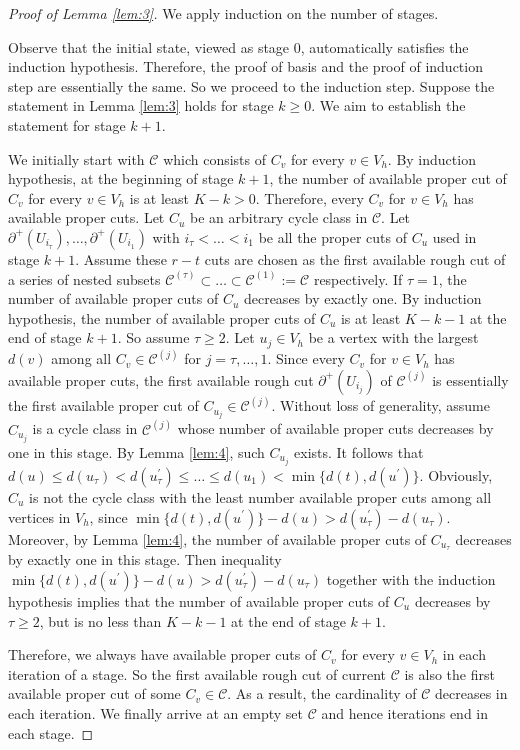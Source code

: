 \documentclass[11pt]{article}
\begin{document}
\begin{proof}[Proof of Lemma \ref{lem:3}]
We apply induction on the number of stages.

Observe that the initial state, viewed as stage 0, automatically satisfies the induction hypothesis. Therefore, the proof of basis and the proof of induction step are essentially the same. So we proceed to the induction step. Suppose the statement in Lemma \ref{lem:3} holds for stage $k\geq 0$. We aim to establish the statement for stage $k+1$.

We initially start with $\mathcal{C}$ which consists of $C_v$ for every $v\in V_h$. By induction hypothesis, at the beginning of stage $k+1$, the number of available proper cut of $C_v$ for every $v\in V_h$ is at least $K-k>0$. Therefore, every $C_v$ for $v\in V_h$ has available proper cuts. Let $C_u$ be an arbitrary cycle class in $\mathcal{C}$. Let $\partial^+(U_{i_\tau}),\dots,\partial^+(U_{i_1})$ with $i_\tau<\dots<i_1$ be all the proper cuts of $C_u$ used in stage $k+1$. Assume these $r-t$ cuts are chosen as the first available rough cut of a series of nested subsets $\mathcal{C}^{(\tau)}\subset\dots\subset\mathcal{C}^{(1)}:=\mathcal{C}$ respectively. If $\tau=1$, the number of available proper cuts of $C_u$ decreases by exactly one. By induction hypothesis, the number of available proper cuts of $C_u$ is at least $K-k-1$ at the end of stage $k+1$. So assume $\tau\geq 2$. Let $u_j\in V_h$ be a vertex with the largest $d(v)$ among all $C_v\in \mathcal{C}^{(j)}$ for $j=\tau,\dots,1$. Since every $C_v$ for $v\in V_h$ has available proper cuts, the first available rough cut $\partial^+(U_{i_j})$ of $\mathcal{C}^{(j)}$ is essentially the first available proper cut of $C_{u_j}\in \mathcal{C}^{(j)}$. Without loss of generality, assume $C_{u_j}$ is a cycle class in $\mathcal{C}^{(j)}$ whose number of available proper cuts decreases by one in this stage. By Lemma \ref{lem:4}, such $C_{u_j}$ exists. It follows that $d(u)\leq d(u_\tau)< d(u^\prime_\tau)\leq\dots\leq d(u_1)< \min\{d(t),d(u^\prime)\}$. Obviously, $C_u$ is not the cycle class with the least number available proper cuts among all vertices in $V_h$, since $\min\{d(t),d(u^\prime)\}-d(u)> d(u_\tau^\prime)-d(u_\tau)$. Moreover, by Lemma \ref{lem:4}, the number of available proper cuts of $C_{u_\tau}$ decreases by exactly one in this stage. Then inequality $\min\{d(t),d(u^\prime)\}-d(u)>d(u_\tau^\prime)-d(u_\tau)$ together with the induction hypothesis implies that the number of available proper cuts of $C_u$ decreases by $\tau\geq 2$, but is no less than $K-k-1$ at the end of stage $k+1$.

Therefore, we always have available proper cuts of $C_v$ for every $v\in V_h$ in each iteration of a stage. So the first available rough cut of current $\mathcal{C}$ is also the first available proper cut of some $C_v\in \mathcal{C}$. As a result, the cardinality of $\mathcal{C}$ decreases in each iteration. We finally arrive at an empty set $\mathcal{C}$ and hence iterations end in each stage.
\end{proof}
\end{document}
